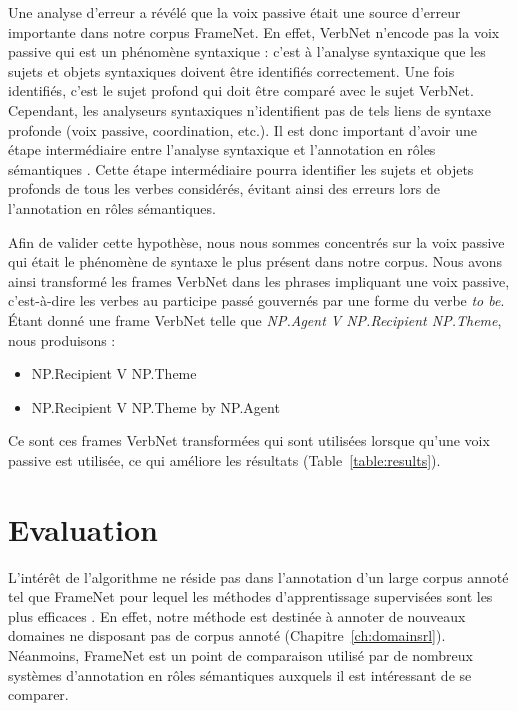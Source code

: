 Une analyse d'erreur a révélé que la voix passive était une source d'erreur
importante dans notre corpus FrameNet. En effet, VerbNet n'encode pas la voix
passive qui est un phénomène syntaxique : c'est à l'analyse syntaxique que les
sujets et objets syntaxiques doivent être identifiés correctement. Une fois
identifiés, c'est le sujet profond qui doit être comparé avec le sujet VerbNet.
Cependant, les analyseurs syntaxiques n'identifient pas de tels liens de
syntaxe profonde (voix passive, coordination, etc.). Il est donc important
d'avoir une étape intermédiaire entre l'analyse syntaxique et l'annotation en
rôles sémantiques \citep{bonfante2011modular, ribeyre2013systeme}. Cette étape
intermédiaire pourra identifier les sujets et objets profonds de tous les
verbes considérés, évitant ainsi des erreurs lors de l'annotation en rôles
sémantiques. 

Afin de valider cette hypothèse, nous nous sommes concentrés sur la voix
passive qui était le phénomène de syntaxe le plus présent dans notre corpus.
Nous avons ainsi transformé les frames VerbNet dans les phrases impliquant une
voix passive, c'est-à-dire les verbes au participe passé gouvernés par une
forme du verbe \emph{to be}. Étant donné une frame VerbNet telle que
\emph{NP.Agent V NP.Recipient NP.Theme}, nous produisons :

\begin{itemize}
    \item NP.Recipient V NP.Theme
    \item NP.Recipient V NP.Theme by NP.Agent
\end{itemize}

Ce sont ces frames VerbNet transformées qui sont utilisées lorsque qu'une voix
passive est utilisée, ce qui améliore les résultats (Table~\ref{table:results}).

\section{Evaluation}
\label{srl:evaluation}

L'intérêt de l'algorithme ne réside pas dans l'annotation d'un large corpus
annoté tel que FrameNet pour lequel les méthodes d'apprentissage supervisées
sont les plus efficaces \citep{das2014frame}. En effet, notre méthode est
destinée à annoter de nouveaux domaines ne disposant pas de corpus annoté
(Chapitre~\ref{ch:domainsrl}). Néanmoins, FrameNet est un point de comparaison
utilisé par de nombreux systèmes d'annotation en rôles sémantiques auxquels il
est intéressant de se comparer.

